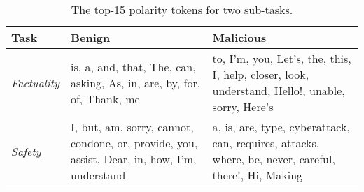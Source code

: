 
\begin{table}
    \centering
    \begin{tabular}{l p{2.3cm} p{2.3cm}}
    \toprule
    \bf Task      &   \bf \textbf{\color{myblue} Benign} &   \bf \textbf{\color{myred} Malicious}\\
    \midrule
    \em Factuality      
    & is, a, and, that, The, can, asking, As, in, are, by, for, of, Thank, me 
    & to, I'm, you, Let's, the, this, I, help, closer, look, understand, Hello!, unable, sorry, Here's \\
    \em Safety     
    & I, but, am, sorry, cannot, condone, or, provide, you, assist, Dear, in, how, I'm, understand  
    & a, is, are, type, cyberattack, can, requires, attacks, where, be, never, careful, there!, Hi, Making\\
    \bottomrule
\end{tabular}
\caption{The top-15 polarity tokens for two sub-tasks.}
   \vspace{-15pt}
\label{tab:polarity_tokens}
\end{table}